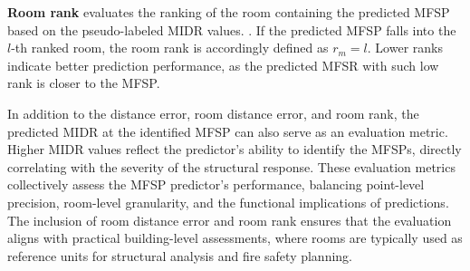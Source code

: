 {\bf{Room rank}} evaluates the ranking of the room containing the predicted MFSP based on the pseudo-labeled MIDR values. . If the predicted MFSP falls into the $l$-th ranked room, the room rank is accordingly defined as $r_{m} = l$. Lower ranks indicate better prediction performance, as the predicted MFSR with such low rank is closer to the MFSP.

In addition to the distance error, room distance error, and room rank, the predicted MIDR at the identified MFSP can also serve as an evaluation metric. Higher MIDR values reflect the predictor's ability to identify the MFSPs, directly correlating with the severity of the structural response. These evaluation metrics collectively assess the MFSP predictor's performance, balancing point-level precision, room-level granularity, and the functional implications of predictions. The inclusion of room distance error and room rank ensures that the evaluation aligns with practical building-level assessments, where rooms are typically used as reference units for structural analysis and fire safety planning.

